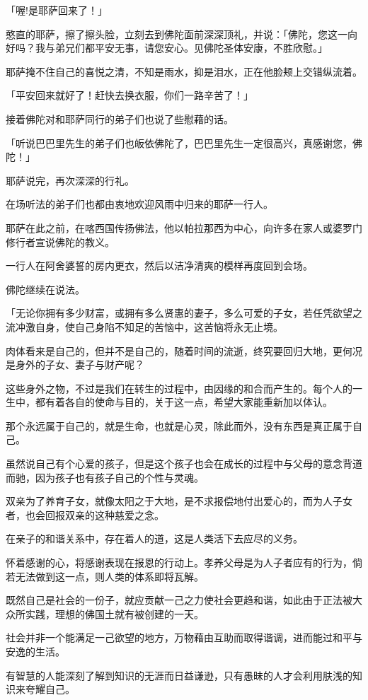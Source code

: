 \documentclass[twoside,openany]{book}
\begin{document}
「喔!是耶萨回来了！」

憨直的耶萨，擦了擦头脸，立刻去到佛陀面前深深顶礼，并说：「佛陀，您这一向好吗？我与弟兄们都平安无事，请您安心。见佛陀圣体安康，不胜欣慰。」

耶萨掩不住自己的喜悦之清，不知是雨水，抑是泪水，正在他脸颊上交错纵流着。

「平安回来就好了！赶快去换衣服，你们一路辛苦了！」

接着佛陀对和耶萨同行的弟子们也说了些慰藉的话。

「听说巴巴里先生的弟子们也皈依佛陀了，巴巴里先生一定很高兴，真感谢您，佛陀！」

耶萨说完，再次深深的行礼。

在场听法的弟子们也都由衷地欢迎风雨中归来的耶萨一行人。

耶萨在此之前，在喀西国传扬佛法，他以帕拉那西为中心，向许多在家人或婆罗门修行者宣说佛陀的教义。

一行人在阿舍婆誓的房内更衣，然后以洁净清爽的模样再度回到会场。

佛陀继续在说法。

「无论你拥有多少财富，或拥有多么贤惠的妻子，多么可爱的子女，若任凭欲望之流冲激自身，使自己身陷不知足的苦恼中，这苦恼将永无止境。

肉体看来是自己的，但并不是自己的，随着时间的流逝，终究要回归大地，更何况是身外的子女、妻子与财产呢？

这些身外之物，不过是我们在转生的过程中，由因缘的和合而产生的。每个人的一生中，都有着各自的使命与目的，关于这一点，希望大家能重新加以体认。

那个永远属于自己的，就是生命，也就是心灵，除此而外，没有东西是真正属于自己。

虽然说自己有个心爱的孩子，但是这个孩子也会在成长的过程中与父母的意念背道而驰，因为孩子也有孩子自己的个性与灵魂。

双亲为了养育子女，就像太阳之于大地，是不求报偿地付出爱心的，而为人子女者，也会回报双亲的这种慈爱之念。

在亲子的和谐关系中，存在着人的道，这是人类活下去应尽的义务。

怀着感谢的心，将感谢表现在报恩的行动上。孝养父母是为人子者应有的行为，倘若无法做到这一点，则人类的体系即将瓦解。

既然自己是社会的一份子，就应贡献一己之力使社会更趋和谐，如此由于正法被大众所实践，理想的佛国土就有被创建的一天。

社会并非一个能满足一己欲望的地方，万物藉由互助而取得谐调，进而能过和平与安逸的生活。

有智慧的人能深刻了解到知识的无涯而日益谦逊，只有愚昧的人才会利用肤浅的知识来夸耀自己。
\end{document}
